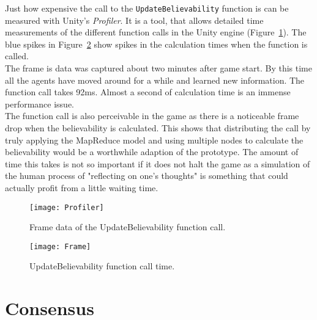 Just how expensive the call to the \verb|UpdateBelievability| function is can be measured with Unity's \textit{Profiler}. It is a tool, that allows detailed time measurements of the different function calls in the Unity engine (Figure~\ref{fig:profiler}). The blue spikes in Figure~\ref{fig:frame} show spikes in the calculation times when the function is called.\\
The frame is data was captured about two minutes after game start. By this time all the agents have moved around for a while and learned new information. The function call takes 92ms. Almost a second of calculation time is an immense performance issue.\\
The function call is also perceivable in the game as there is a noticeable frame drop when the believability is calculated. This shows that distributing the call by truly applying the MapReduce model and using multiple nodes to calculate the believability would be a worthwhile adaption of the prototype. The amount of time this takes is not so important if it does not halt the game as a simulation of the human process of "reflecting on one's thoughts" is something that could actually profit from a little waiting time.
\begin{figure}
	\centering
	\texttt{[image: Profiler]}
	\caption{Frame data of the UpdateBelievability function call.}
	\label{fig:profiler}
\end{figure}
\begin{figure}
	\centering
	\texttt{[image: Frame]}
	\caption{UpdateBelievability function call time.}
	\label{fig:frame}
\end{figure}
\section{Consensus}
